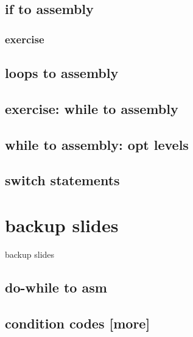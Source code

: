 \subsection{if to assembly}



\subsubsection{exercise}



\subsection{loops to assembly}



\subsection{exercise: while to assembly}



\subsection{while to assembly: opt levels}



\subsection{switch statements}




\section{backup slides}
\begin{frame}{backup slides}
\end{frame}

\subsection{do-while to asm}



\subsection{condition codes [more]}

